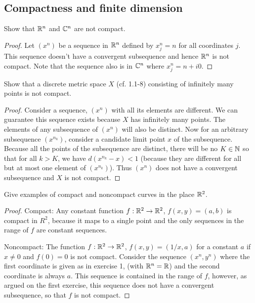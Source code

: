 \subsection{Compactness and finite dimension}


\begin{exercise}{1}
Show that $\mathbb{R}^n$ and $\mathbb{C}^n$ are not compact.
\end{exercise}
\begin{proof}
Let $(x^n)$ be a sequence in $\mathbb{R}^n$ defined by $x^n_j=n$ for all coordinates $j$. This sequence doesn't have a convergent subsequence and hence $\mathbb{R}^n$ is not compact. Note that the sequence also is in $\mathbb{C}^n$ where $x^n_j=n+i0$.
\end{proof}

\begin{exercise}{2}
Show that a discrete metric space $X$ (cf. 1.1-8) consisting of infinitely many points is not compact.
\end{exercise}
\begin{proof}
Consider a sequence, $(x^n)$ with all its elements are different. We can guarantee this sequence exists because $X$ has infinitely many points. The elements of any subsequence of $(x^n)$  will also be distinct. Now for an arbitrary subsequence $(x^{n_k})$, consider a candidate limit point $x$ of the subsequence. Because all the points of the subsequence are distinct, there will be no $K\in\mathbb{N}$ so that for all $k>K$, we have $d(x^{n_k}-x)<1$ (because they are different for all but at most one element of $(x^{n_k})$). Thus $(x^n)$ does not have a convergent subsequence and $X$ is not compact.
\end{proof}

\begin{exercise}{3}
Give examples of compact and noncompact curves in the place $\mathbb{R}^2$.
\end{exercise}
\begin{proof}
Compact: Any constant function $f:\mathbb{R}^2\to\mathbb{R}^2$, $f(x,y)=(a,b)$ is compact in $R^2$, because it maps to a single point and the only sequences in the range of $f$ are constant sequences.

Noncompact: The function $f:\mathbb{R}^2\to\mathbb{R}^2$, $f(x,y)=(1/x,a)$ for a constant $a$ if $x\neq 0$ and $f(0)=0$ is not compact. Consider the sequence $(x^n,y^n)$ where the first coordinate is given as in exercise 1, (with $\mathbb{R}^n=\mathbb{R}$) and the second coordinate is always $a$. This sequence is contained in the range of $f$, however, as argued on the first exercise, this sequence does not have a convergent subsequence, so that $f$ is not compact.
\end{proof}


